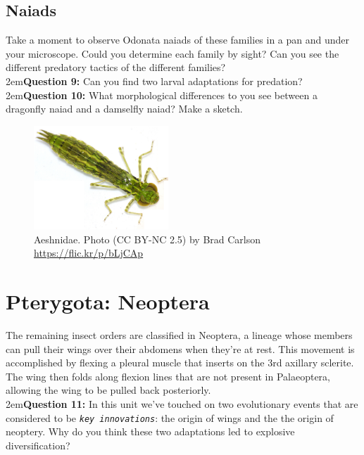 \documentclass[letterpaper, 11pt]{article}
\newcommand{\latinword}[1]{\texttt{\itshape #1}}%
\begin{document}
\subsection{Naiads}
Take a moment to observe Odonata naiads of these families in a pan and under your microscope. Could you determine each family by sight? Can you see the different predatory tactics of the different families?\\

\hangindent2em\textbf{Question 9:} Can you find two larval adaptations for predation?\\

\hangindent2em\textbf{Question 10:} What morphological differences to you see between a dragonfly naiad and a damselfly naiad? Make a sketch.

\begin{figure}[ht!]
  \centering
    \includegraphics[width=0.45\textwidth]{AeshnidLarva}
  \caption{Aeshnidae. Photo (CC BY-NC 2.5) by Brad Carlson \url{https://flic.kr/p/bLjCAp}}
  \label{fig:OdonataLarva}
\end{figure}

\FloatBarrier

\section*{Pterygota: Neoptera}
The remaining insect orders are classified in Neoptera, a lineage whose members can pull their wings over their abdomens when they're at rest. This movement is accomplished by flexing a pleural muscle that inserts on the 3rd axillary sclerite. The wing then folds along flexion lines that are not present in Palaeoptera, allowing the wing to be pulled back posteriorly.\\

\hangindent2em\textbf{Question 11:} In this unit we've touched on two evolutionary events that are considered to be \latinword{key innovations}: the origin of wings and the the origin of neoptery. Why do you think these two adaptations led to explosive diversification?
\end{document}
